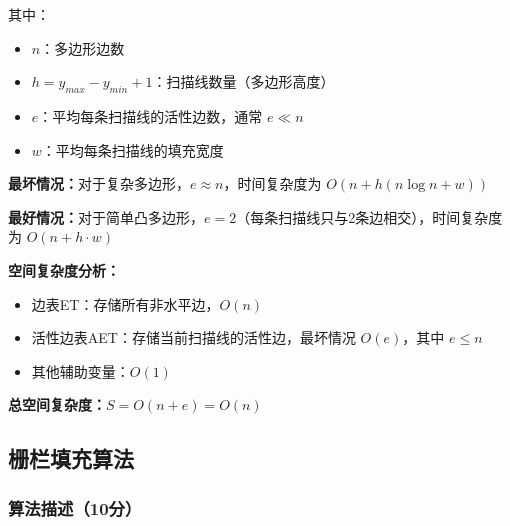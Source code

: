 ﻿\documentclass[12pt,a4paper]{article}
\begin{document}
其中：
\begin{itemize}
\item $n$：多边形边数
\item $h = y_{max} - y_{min} + 1$：扫描线数量（多边形高度）
\item $e$：平均每条扫描线的活性边数，通常 $e \ll n$
\item $w$：平均每条扫描线的填充宽度
\end{itemize}

\textbf{最坏情况：}对于复杂多边形，$e \approx n$，时间复杂度为 $O(n + h(n \log n + w))$

\textbf{最好情况：}对于简单凸多边形，$e = 2$（每条扫描线只与2条边相交），时间复杂度为 $O(n + h \cdot w)$

\vspace{3mm}
\textbf{空间复杂度分析：}

\begin{itemize}
\item 边表ET：存储所有非水平边，$O(n)$
\item 活性边表AET：存储当前扫描线的活性边，最坏情况 $O(e)$，其中 $e \leq n$
\item 其他辅助变量：$O(1)$
\end{itemize}

\textbf{总空间复杂度：}$S = O(n + e) = O(n)$

\subsection{栅栏填充算法}

\subsubsection{算法描述（10分）}
\end{document}
